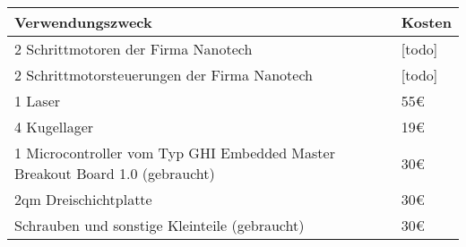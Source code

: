 \begin{tabular}{|p{11cm}|p{3cm}|}
\hline \rowcolor{lightgray}
\textbf{Verwendungszweck} & \textbf{Kosten}\\
\hline
2 Schrittmotoren der Firma Nanotech & [todo]\\
\hline
2 Schrittmotorsteuerungen der Firma Nanotech & [todo]\\
\hline
1 Laser & 55\euro{}\\
\hline
4 Kugellager & 19\euro{}\\
\hline
1 Microcontroller vom Typ GHI Embedded Master Breakout Board 1.0 (gebraucht) & 30\euro{}\\ 
\hline
2qm Dreischichtplatte & 30\euro{}\\ 
\hline
Schrauben und sonstige Kleinteile (gebraucht) & 30\euro{}\\ 
\hline
\end{tabular}
